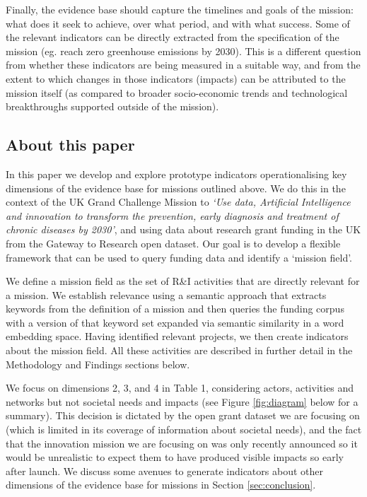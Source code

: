 \documentclass[11pt]{article}
\begin{document}
Finally, the evidence base should capture the time\-lines and goals of the mission: what does it seek to achieve, over what period, and with what success. Some of the relevant indicators can be directly extracted from the specification of the mission (eg. reach zero greenhouse emissions by 2030). This is a different question from whether these indicators are being measured in a suitable way, and from the extent to which changes in those indicators (impacts) can be attributed to the mission itself (as compared to broader socio-economic trends and technological breakthroughs supported outside of the mission). 

\subsection{About this paper}
\label{subsec: about}

In this paper we develop and explore prototype indicators operationalising key dimensions of the evidence base for missions outlined above. We do this in the context of the UK Grand Challenge Mission to \textit{`Use data, Artificial Intelligence and innovation to transform the prevention, early diagnosis and treatment of chronic diseases by 2030'}, and using data about research grant funding in the UK from the Gateway to Research open dataset. Our goal is to develop a flexible framework that can be used to query funding data and identify a `mission field'. 

We define a mission field as the set of R&I activities that are directly relevant for a mission. We establish relevance using a semantic approach that extracts keywords from the definition of a mission and then queries the funding corpus with a version of that keyword set expanded via semantic similarity in a word embedding space. Having identified relevant projects, we then create indicators about the mission field. All these activities are described in further detail in the Methodology and Findings sections below.

We focus on dimensions 2, 3, and 4 in Table 1, considering actors, activities and networks but not societal needs and impacts (see Figure \ref{fig:diagram} below for a summary). This decision is dictated by the open grant dataset we are focusing on (which is limited in its coverage of information about societal needs), and the fact that the innovation mission we are focusing on was only recently announced so it would be unrealistic to expect them to have produced visible impacts so early after launch. We discuss some avenues to generate indicators about other dimensions of the evidence base for missions in Section \ref{sec:conclusion}.
\end{document}

